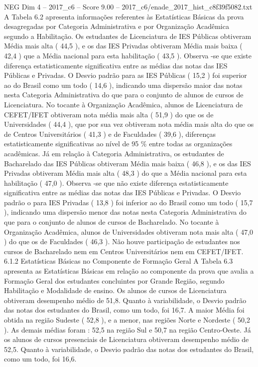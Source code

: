 \begin{textsample}{NEG Dim 4 – 2017\_c6 – Score 9.00 – 2017\_c6/enade\_2017\_hist\_c8f39f5082.txt}
A Tabela 6.2 apresenta informações referentes às Estatísticas Básicas da prova desagregadas por Categoria Administrativa e por Organização Acadêmica segundo a Habilitação.
Os estudantes de Licenciatura de IES Públicas obtiveram Média mais alta ( 44,5 ), e os das IES Privadas obtiveram Média mais baixa ( 42,4 ) que a Média nacional para esta habilitação ( 43,5 ).
Observa -se que existe diferença estatisticamente significativa entre as médias das notas das IES Públicas e Privadas.
O Desvio padrão para as IES Públicas ( 15,2 ) foi superior ao do Brasil como um todo ( 14,6 ), indicando uma dispersão maior das notas nesta Categoria Administrativa do que para o conjunto de alunos de cursos de Licenciatura.
No tocante à Organização Acadêmica, alunos de Licenciatura de CEFET/IFET obtiveram nota média mais alta ( 51,9 ) do que os de Universidades ( 44,4 ), que por sua vez obtiveram nota média mais alta do que os de Centros Universitários ( 41,3 ) e de Faculdades ( 39,6 ), diferenças estatisticamente significativas ao nível de 95 \% entre todas as organizações acadêmicas.
Já em relação à Categoria Administrativa, os estudantes de Bacharelado das IES Públicas obtiveram Média mais baixa ( 46,8 ), e os das IES Privadas obtiveram Média mais alta ( 48,3 ) do que a Média nacional para esta habilitação ( 47,0 ).
Observa -se que não existe diferença estatisticamente significativa entre as médias das notas das IES Públicas e Privadas.
O Desvio padrão o para IES Privadas ( 13,8 ) foi inferior ao do Brasil como um todo ( 15,7 ), indicando uma dispersão menor das notas nesta Categoria Administrativa do que para o conjunto de alunos de cursos de Bacharelado.
No tocante à Organização Acadêmica, alunos de Universidades obtiveram nota mais alta ( 47,0 ) do que os de Faculdades ( 46,3 ).
Não houve participação de estudantes nos cursos de Bacharelado nem em Centros Universitários nem em CEFET/IFET. 6.1.2 Estatísticas Básicas no Componente de Formação Geral A Tabela 6.3 apresenta as Estatísticas Básicas em relação ao componente da prova que avalia a Formação Geral dos estudantes concluintes por Grande Região, segundo Habilitação e Modalidade de ensino.
Os alunos de cursos de Licenciatura obtiveram desempenho médio de 51,8.
Quanto à variabilidade, o Desvio padrão das notas dos estudantes do Brasil, como um todo, foi 16,7.
A maior Média foi obtida na região Sudeste ( 52,8 ), e a menor, nas regiões Norte e Nordeste ( 50,2 ).
As demais médias foram : 52,5 na região Sul e 50,7 na região Centro-Oeste.
Já os alunos de cursos presenciais de Licenciatura obtiveram desempenho médio de 52,5.
Quanto à variabilidade, o Desvio padrão das notas dos estudantes do Brasil, como um todo, foi 16,6.

\end{textsample}
